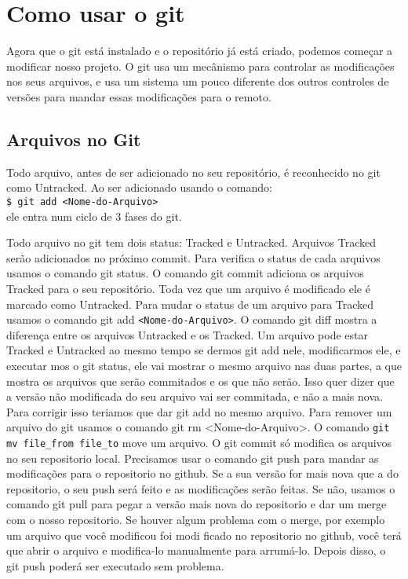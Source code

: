 \documentclass{article}
\begin{document}
\section{Como usar o git}
	Agora que o git está instalado e o repositório já está criado, podemos
começar a modificar nosso projeto. O git usa um mecânismo para controlar as
modificações nos seus arquivos, e usa um sistema um pouco diferente dos outros
controles de versões para mandar essas modificações para o remoto.

\subsection{Arquivos no Git}
    Todo arquivo, antes de ser adicionado no seu repositório, é reconhecido no git
como Untracked. Ao ser adicionado usando o comando:\\
\verb#$ git add <Nome-do-Arquivo>#\\
ele entra num ciclo de 3 fases do git.
 
    
    Todo arquivo no git tem dois status: Tracked e Untracked. Arquivos Tracked 
serão adicionados no próximo commit. Para verifica o status de cada arquivos 
usamos o comando git status. O comando git commit adiciona os arquivos Tracked 
para o seu repositório. Toda vez que um arquivo é modificado ele é marcado como 
Untracked. Para mudar o status de um arquivo para 
Tracked usamos o comando git add \verb#<Nome-do-Arquivo>#. O comando git diff mostra a 
diferença entre os arquivos Untracked e os Tracked. Um arquivo pode estar Tracked
e Untracked ao mesmo tempo se dermos git add nele, modificarmos ele, e executar
mos o git status, ele vai mostrar o mesmo arquivo nas duas partes, a que mostra 
os arquivos que serão commitados e os que não serão. Isso quer dizer que a versão
não modificada do seu arquivo vai ser commitada, e não a mais nova. Para corrigir
isso teriamos que dar git add no mesmo arquivo. Para remover um arquivo do git 
usamos o comando git rm <Nome-do-Arquivo>. O comando \verb#git mv file_from file_to#
move um arquivo.
	O git commit só modifica os arquivos no seu repositorio local. Precisamos 
usar o comando git push para mandar as modificações para o repositorio no github.
Se a sua versão for mais nova que a do repositorio, o seu push será feito e as 
modificações serão feitas. Se não, usamos o comando git pull para pegar a versão
mais nova do repositorio e dar um merge com o nosso repositorio. Se houver
algum problema com o merge, por exemplo um arquivo que você modificou foi modi
ficado no repositorio no github, você terá que abrir o arquivo e modifica-lo
manualmente para arrumá-lo. Depois disso, o git push poderá ser executado sem
problema.
\end{document}
